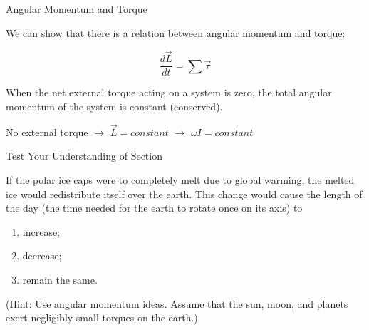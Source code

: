 \documentclass[]{beamer}
\begin{document}

\begin{frame}


  Angular Momentum and Torque
  
  \vspace{7mm}
  
  
  We can show that there is a relation between angular momentum and torque:
  \pause

  \begin{equation}
   \frac{d\vec{L}}{dt} =\sum \vec{\tau}
  \end{equation}
  
  \pause
  When the net external torque acting on a system is zero, the total angular
momentum of the system is constant (conserved).
  
\pause
\vspace{7mm}
No external torque $\rightarrow$ $\vec{L}=constant$ $\rightarrow$ $\omega I=constant$
  
  \end{frame}



\begin{frame}

  Test Your Understanding of Section

  \vspace{7mm}


  If the polar ice caps were to completely
melt due to global warming, the melted ice would redistribute itself over the earth.
This change would cause the length of the day (the time needed for the earth to rotate
once on its axis) to
\vspace{7mm}

\begin{enumerate}
  \item increase;
  \item decrease;
  \item remain the same.
\end{enumerate}
\vspace{7mm}

 (Hint: Use angular
momentum ideas. Assume that the sun, moon, and planets exert negligibly small torques
on the earth.)

  
  \end{frame}


\end{document}
